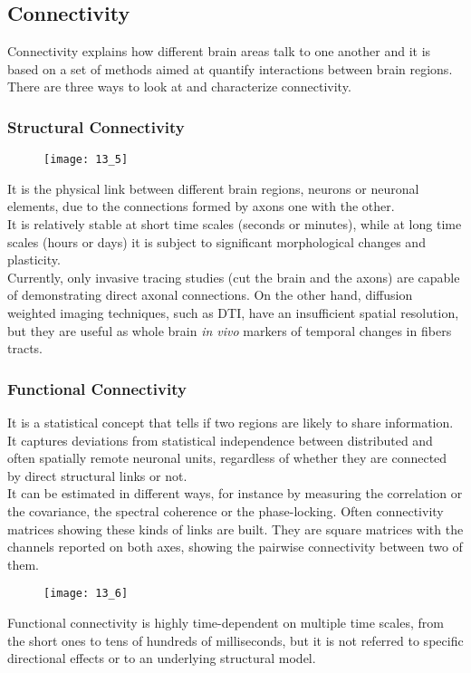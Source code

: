 \subsection{Connectivity}
Connectivity explains how different brain areas talk to one another and it is based
on a set of methods aimed at quantify interactions between brain regions. There are
three ways to look at and characterize connectivity.
\subsubsection{Structural Connectivity}
\begin{figure}[H]
    \centering
    \texttt{[image: 13\_5]}
\end{figure}
It is the physical link between different brain regions, neurons or neuronal elements,
due to the connections formed by axons one with the other.\\
It is relatively stable at short time scales (seconds or minutes), while at long time
scales (hours or days) it is subject to significant morphological changes and
plasticity.\\
Currently, only invasive tracing studies (cut the brain and the axons) are capable of
demonstrating direct axonal connections. On the other hand, diffusion weighted imaging
techniques, such as DTI, have an insufficient spatial resolution, but they are useful
as whole brain \textit{in vivo} markers of temporal changes in fibers tracts.
\subsubsection{Functional Connectivity}
It is a statistical concept that tells if two regions are likely to share information.
It captures deviations from statistical independence between distributed and often
spatially remote neuronal units, regardless of whether they are connected by direct
structural links or not.\\
It can be estimated in different ways, for instance by measuring the correlation or
the covariance, the spectral coherence or the phase-locking. Often connectivity
matrices showing these kinds of links are built. They are square matrices with the
channels reported on both axes, showing the pairwise connectivity between two of them.
\begin{figure}[H]
    \centering
    \texttt{[image: 13\_6]}
\end{figure}
Functional connectivity is highly time-dependent on multiple time scales,
from the short ones to tens of hundreds of milliseconds, but it is not referred to
specific directional effects or to an underlying structural model.
